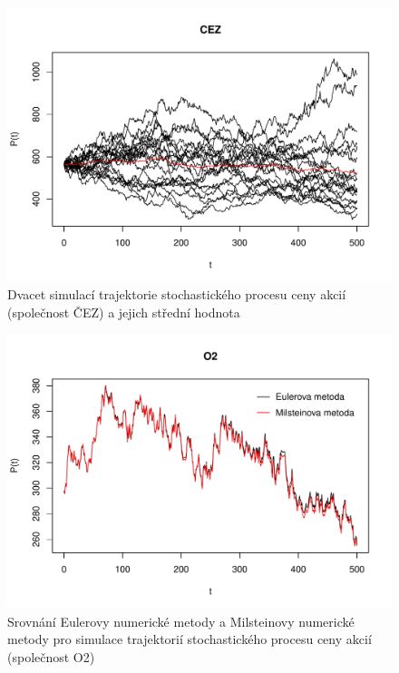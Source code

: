 \documentclass[a4paper,12pt]{report}
\theoremstyle{definition} \newtheorem{definice}[veta]{Definice}
\theoremstyle{remark}
\begin{document}
\begin{figure}[!htbp]
  \centering 
	\includegraphics[width=13.5cm, clip, trim= 0 15 25 50]{IMG/avg_CEZ_v1.pdf}
  \caption{Dvacet simulací trajektorie stochastického procesu ceny akcií (společnost ČEZ) a jejich střední hodnota}  \label{avg_trajektorie}
\end{figure}

\begin{figure}[!htbp]
  \centering 
	\includegraphics[width=13.5cm, clip, trim= 0 15 25 50]{IMG/e_m_o2_v2.pdf}
  \caption{Srovnání Eulerovy numerické metody a Milsteinovy numerické metody pro simulace trajektorií stochastického procesu ceny akcií (společnost O2)}  \label{euler_milstein}
\end{figure}
\end{document}
